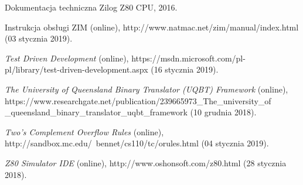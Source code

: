 \documentclass[12pt,a4paper]{report}
\begin{document}
\begin{flushleft}
\begin{thebibliography}{99}
		Dokumentacja techniczna Zilog Z80 CPU, 2016.
		
		Instrukcja obsługi ZIM (online),
		http://www.natmac.net/zim/manual/index.html (03 stycznia 2019).
	
		\emph{Test Driven Development} (online),
		https://msdn.microsoft.com/pl-pl/library/test-driven-development.aspx (16 stycznia 2019).
		
		\emph{The University of Queensland Binary Translator (UQBT) Framework} (online),
		https://www.researchgate.net/publication/239665973\_The\_university\_of
		\_queensland\_binary\_translator\_uqbt\_framework (10 grudnia 2018).

		\emph{Two's Complement Overflow Rules} (online),
		http://sandbox.mc.edu/~bennet/cs110/tc/orules.html (04 stycznia 2019).
		
		\emph{Z80 Simulator IDE} (online),
		http://www.oshonsoft.com/z80.html (28 stycznia 2018).		
		

		
			
		
		
		
			
		
		
		
	\end{thebibliography}
	\end{flushleft}
\end{document}
